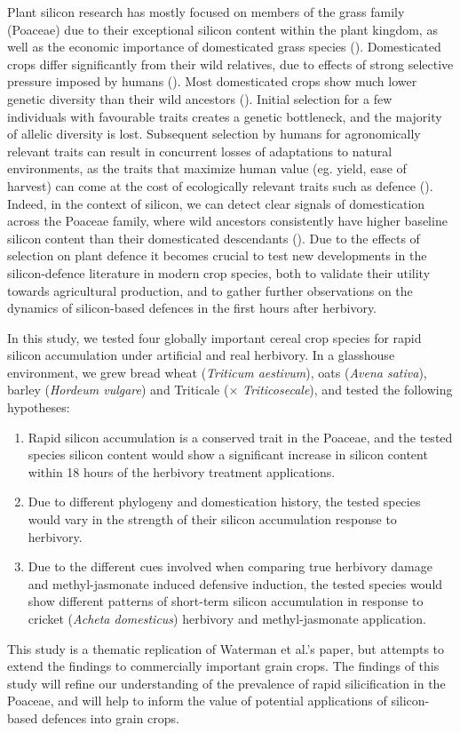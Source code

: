 \documentclass[12pt, letterpaper, ]{report}
\begin{document}
Plant silicon research has mostly focused on members of the grass family (Poaceae) due to their exceptional silicon content within the plant kingdom, as well as the economic importance of domesticated grass species (\cite{reynolds_silicon_2016}). Domesticated crops differ significantly from their wild relatives, due to effects of strong selective pressure imposed by humans (\cite{chen_crop_2015}). Most domesticated crops show much lower genetic diversity than their wild ancestors (\cite{hafeez_creation_2021, smith_domestication_2019}). Initial selection for a few individuals with favourable traits creates a genetic bottleneck, and the majority of allelic diversity is lost. Subsequent selection by humans for agronomically relevant traits can result in concurrent losses of adaptations to natural environments, as the traits that maximize human value (eg. yield, ease of harvest) can come at the cost of ecologically relevant traits such as defence (\cite{whitehead_domestication_2017, chen_crop_2015}). Indeed, in the context of silicon, we can detect clear signals of domestication across the Poaceae family, where wild ancestors consistently have higher baseline silicon content than their domesticated descendants (\cite{simpson_still_2017}). Due to the effects of selection on plant defence it becomes crucial to test new developments in the silicon-defence literature in modern crop species, both to validate their utility towards agricultural production, and to gather further observations on the dynamics of silicon-based defences in the first hours after herbivory.

In this study, we tested four globally important cereal crop species for rapid silicon accumulation under artificial and real herbivory. In a glasshouse environment, we grew bread wheat (\textit{Triticum aestivum}), oats (\textit{Avena sativa}), barley (\textit{Hordeum vulgare}) and Triticale ($\times$ \textit{Triticosecale}), and tested the following hypotheses:
\begin{enumerate}
        \item Rapid silicon accumulation is a conserved trait in the Poaceae, and the tested species silicon content would show a significant increase in silicon content within 18 hours of the herbivory treatment applications.
        \item Due to different phylogeny and domestication history, the tested species would vary in the strength of their silicon accumulation response to herbivory. 
        \item Due to the different cues involved when comparing true herbivory damage and methyl-jasmonate induced defensive induction, the tested species would show different patterns of short-term silicon accumulation in response to cricket (\textit{Acheta domesticus}) herbivory and methyl-jasmonate application. 
\end{enumerate}
This study is a thematic replication of Waterman et al.’s  paper, but attempts to extend the findings to commercially important grain crops. The findings of this study will refine our understanding of the prevalence of rapid silicification in the Poaceae, and will help to inform the value of potential applications of silicon-based defences into grain crops.
\end{document}
